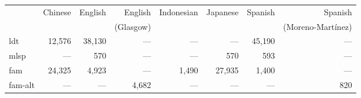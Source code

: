 \begin{tabular}{lrrrrrrr}
\toprule
 & Chinese & English & English & Indonesian & Japanese & Spanish & Spanish \\
 &  &  & (Glasgow) &  &  &  & (Moreno-Martínez) \\
\midrule
ldt & 12,576 & 38,130 & --- & --- & --- & 45,190 & --- \\
\cellcolor[HTML]{EEEEEE} mlsp & \cellcolor[HTML]{EEEEEE} --- & \cellcolor[HTML]{EEEEEE} 570 & \cellcolor[HTML]{EEEEEE} --- & \cellcolor[HTML]{EEEEEE} --- & \cellcolor[HTML]{EEEEEE} 570 & \cellcolor[HTML]{EEEEEE} 593 & \cellcolor[HTML]{EEEEEE} --- \\
fam & 24,325 & 4,923 & --- & 1,490 & 27,935 & 1,400 & --- \\
\cellcolor[HTML]{EEEEEE} fam-alt & \cellcolor[HTML]{EEEEEE} --- & \cellcolor[HTML]{EEEEEE} --- & \cellcolor[HTML]{EEEEEE} 4,682 & \cellcolor[HTML]{EEEEEE} --- & \cellcolor[HTML]{EEEEEE} --- & \cellcolor[HTML]{EEEEEE} --- & \cellcolor[HTML]{EEEEEE} 820 \\
\bottomrule
\end{tabular}
